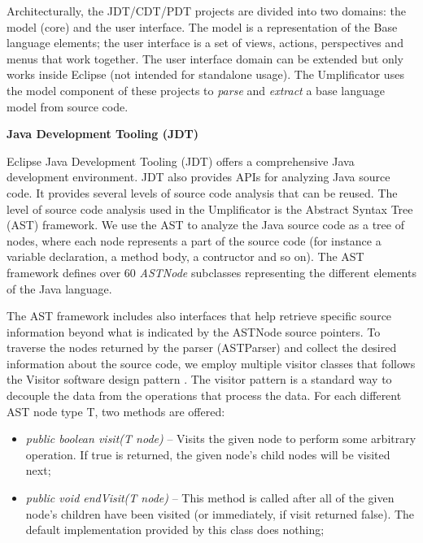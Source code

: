 Architecturally, the JDT/CDT/PDT projects are divided into two domains: the model (core) and the user interface. The model is a representation of the Base language elements; the user interface is a set of views, actions, perspectives and menus that work together. The user interface domain can be extended but only works inside Eclipse (not intended for standalone usage).  The Umplificator uses the model component of these projects to \textit{parse} and \textit{extract} a base language model from source code. 

\textbf{Java Development Tooling (JDT)}

 Eclipse Java Development Tooling (JDT) \cite{jdtProject} offers a comprehensive Java development environment. JDT also provides APIs for analyzing Java source code. It provides several levels of source code analysis that can be reused. The level of source code analysis used in the Umplificator is the Abstract Syntax Tree (AST) framework. We use the AST to analyze the Java source code as a tree of nodes, where each node represents a part of the source code (for instance a variable declaration, a method body, a contructor and so on). The AST framework defines over 60 \textit{ASTNode} \cite{astnodeapi} subclasses representing the different elements of the Java language. 
 
  
The AST framework includes also interfaces that help retrieve specific source information beyond what is indicated by the ASTNode source pointers. To traverse the nodes returned by the parser (ASTParser) and collect the desired information about the source code, we employ multiple visitor classes that follows the Visitor software design pattern \cite{gamma1994design}. 
The visitor pattern is a standard way to decouple the data from the operations that process the data.
For each different AST node type T, two methods are offered:

\begin{itemize}

\item  \textit{public boolean visit(T node)} -- Visits the given node to perform some arbitrary operation. If true is returned, the given node's child nodes will be visited next;
\item  \textit{public void endVisit(T node)} --  This method is called after all of the given node's children have been visited (or immediately, if visit returned false). The default implementation provided by this class does nothing;
\end{itemize}

